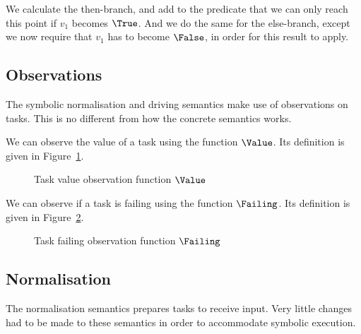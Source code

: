 We calculate the then-branch, and add to the predicate that we can only reach this point if $v_1$ becomes $\True$.
And we do the same for the else-branch, except we now require that $v_1$ has to become $\False$, in order for this result to apply.

\subsection{Observations}

The symbolic normalisation and driving semantics make use of observations on tasks.
This is no different from how the concrete \TOPHAT semantics works.

We can observe the value of a task using the function $\Value$.
Its definition is given in Figure~\ref{fig:value}.

\begin{figure}
  \begin{center}
    \small
  \end{center}
  \caption{Task value observation function $\Value$}
  \label{fig:value}
\end{figure}

We can observe if a task is failing using the function $\Failing$.
Its definition is given in Figure~\ref{fig:failing}.

\begin{figure}
  \begin{center}
    \small
  \end{center}
  \caption{Task failing observation function $\Failing$}
  \label{fig:failing}
\end{figure}


\subsection{Normalisation}

The normalisation semantics prepares tasks to receive input.
Very little changes had to be made to these semantics in order to accommodate symbolic execution.


